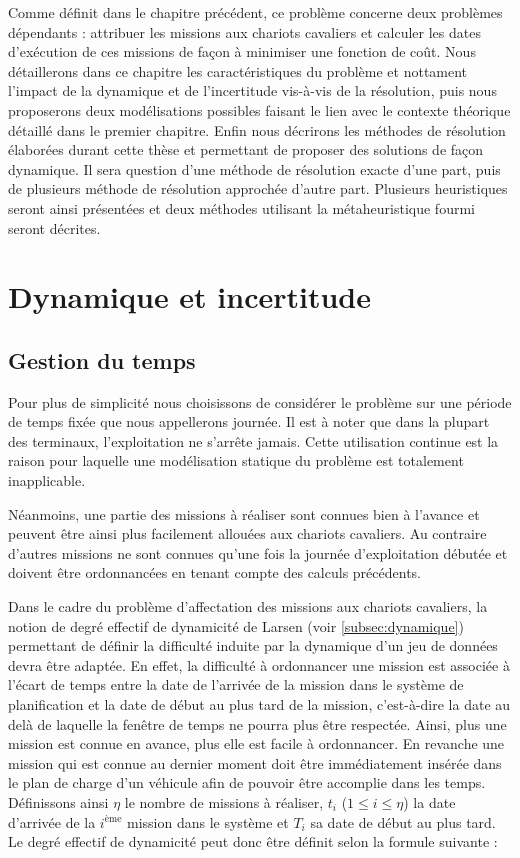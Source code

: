 
Comme définit dans le chapitre précédent, ce problème concerne deux problèmes dépendants : attribuer les missions aux chariots cavaliers et calculer les dates d'exécution de ces missions de façon à minimiser une fonction de coût. 
Nous détaillerons dans ce chapitre les caractéristiques du problème et nottament l'impact de la dynamique et de l'incertitude vis-à-vis de la résolution, puis nous proposerons deux modélisations possibles faisant le lien avec le contexte théorique détaillé dans le premier chapitre. Enfin nous décrirons les méthodes de résolution élaborées durant cette thèse et permettant de proposer des solutions de façon dynamique. Il sera question d'une méthode de résolution exacte d'une part, puis de plusieurs méthode de résolution approchée d'autre part. Plusieurs heuristiques seront ainsi présentées et deux méthodes utilisant la métaheuristique fourmi seront décrites.

\section{Dynamique et incertitude}

\subsection{Gestion du temps}

Pour plus de simplicité nous choisissons de considérer le problème sur une période de temps fixée que nous appellerons journée. Il est à noter que dans la plupart des terminaux, l'exploitation ne s'arrête jamais. Cette utilisation continue est la raison pour laquelle une modélisation statique du problème est totalement inapplicable.

Néanmoins, une partie des missions à réaliser sont connues bien à l'avance et peuvent être ainsi plus facilement allouées aux chariots cavaliers. Au contraire d'autres missions ne sont connues qu'une fois la journée d'exploitation débutée et doivent être ordonnancées en tenant compte des calculs précédents.

Dans le cadre du problème d'affectation des missions aux chariots cavaliers, la notion de degré effectif de dynamicité de Larsen (voir \ref{subsec:dynamique}) permettant de définir la difficulté induite par la dynamique d'un jeu de données devra être adaptée. En effet, la difficulté à ordonnancer une mission est associée à l'écart de temps entre la date de l'arrivée de la mission dans le système de planification et la date de début au plus tard de la mission, c'est-à-dire la date au delà de laquelle la fenêtre de temps ne pourra plus être respectée. Ainsi, plus une mission est connue en avance, plus elle est facile à ordonnancer. En revanche une mission qui est connue au dernier moment doit être immédiatement insérée dans le plan de charge d'un véhicule afin de pouvoir être accomplie dans les temps. Définissons ainsi $\eta$ le nombre de missions à réaliser, $t_i$ ($1 \leq i \leq \eta$) la date d'arrivée de la $i^{\text{ème}}$ mission dans le système et $T_i$ sa date de début au plus tard. Le degré effectif 
de dynamicité peut donc être définit selon la formule suivante : 

